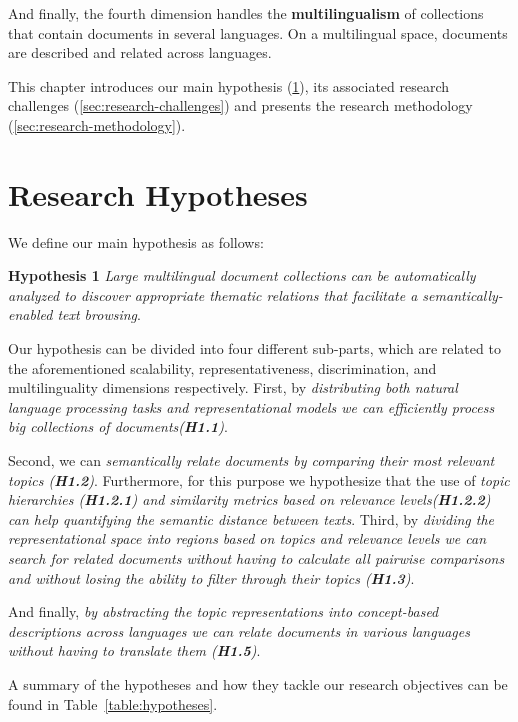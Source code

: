 And finally, the fourth dimension handles the \textbf{multilingualism} of collections that contain documents in several languages. On a multilingual space, documents are described and related across languages.

This chapter introduces our main hypothesis (\ref{sec:research-hypothesis}), its associated research challenges (\ref{sec:research-challenges}) and presents the research methodology (\ref{sec:research-methodology}).

\section{Research Hypotheses}\label{sec:research-hypothesis}

We define our main hypothesis as follows:

\textbf{Hypothesis 1} \textit{Large multilingual document collections can be automatically analyzed to discover appropriate thematic relations that facilitate a semantically-enabled text browsing}.

Our hypothesis can be divided into four different sub-parts, which are related to the aforementioned scalability, representativeness, discrimination, and multilinguality dimensions respectively. First, by \textit{distributing both natural language processing tasks and representational models we can efficiently process big collections of documents(\textbf{H1.1})}.

Second, we can \textit{semantically relate documents by comparing their most relevant topics (\textbf{H1.2})}. Furthermore, for this purpose we hypothesize that the use of \textit{topic hierarchies (\textbf{H1.2.1}) and similarity metrics based on relevance levels(\textbf{H1.2.2}) can help quantifying the semantic distance between texts}. Third, by \textit{dividing the representational space into regions based on topics and relevance levels we can search for related documents without having to calculate all pairwise comparisons and without losing the ability to filter through their topics (\textbf{H1.3})}.

And finally, \textit{by abstracting the topic representations into concept-based descriptions across languages we can relate documents in various languages without having to translate them (\textbf{H1.5})}.

A summary of the hypotheses and how they tackle our research objectives can be found in Table~\ref{table:hypotheses}.

